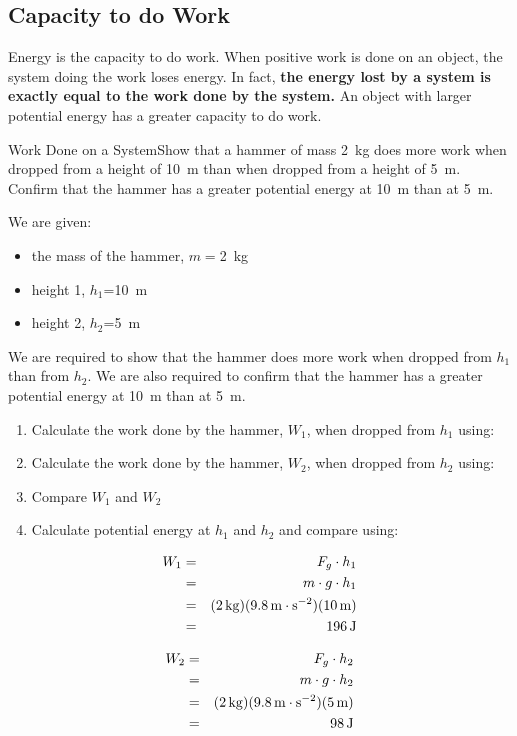 \subsection{Capacity to do Work}
Energy is the capacity to do work. When positive work is done on an object, the system doing the work loses energy. In fact, {\bf the energy lost by a system is exactly equal to the work done by the system.} An object with larger potential energy has a greater capacity to do work.

\begin{wex}{Work Done on a System}{Show that a hammer of mass 2~kg does more work when dropped from a height of 10~m than when dropped from a height of 5~m. Confirm that the hammer has a greater potential energy at 10~m than at 5~m.}
{
We are given:
\begin{itemize}
\item{the mass of the hammer, $m=$2~kg}
\item{height 1, $h_1$=10~m}
\item{height 2, $h_2$=5~m}
\end{itemize}
We are required to show that the hammer does more work when dropped from $h_1$ than from $h_2$. We are also required to confirm that the hammer has a greater potential energy at 10~m than at 5~m.

\begin{enumerate}
\item{Calculate the work done by the hammer, $W_1$, when dropped from $h_1$ using:
}
\item{Calculate the work done by the hammer, $W_2$, when dropped from $h_2$ using:
}
\item{Compare $W_1$ and $W_2$}
\item{Calculate potential energy at $h_1$ and $h_2$ and compare using:
}
\end{enumerate}

\begin{eqnarray*}
W_1&=&F_g\cdot h_1\\
&=&m\cdot g \cdot h_1\\
&=&(2\,\mathrm{kg})(9.8\,\mathrm{m \cdot s^{-2}})(10\,\rm{m})\\
&=&196\,\mathrm{J}
\end{eqnarray*}

\begin{eqnarray*}
W_2&=&F_g\cdot h_2\\
&=&m\cdot g \cdot h_2\\
&=&(2\,\mathrm{kg})(9.8\,\mathrm{m \cdot s^{-2}})(5\,\rm{m})\\
&=&98\,\mathrm{J}
\end{eqnarray*}

}
\end{wex}
